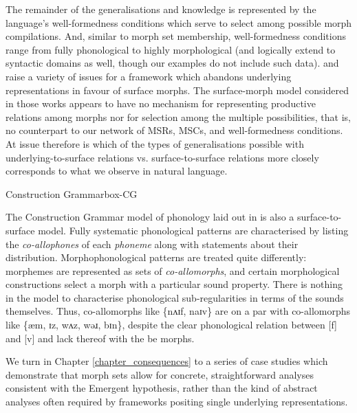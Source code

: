 The remainder of the generalisations and knowledge is represented by the language's well-formedness conditions which serve to select among possible morph compilations. And, similar to morph set membership, well-formedness conditions range from fully phonological to highly morphological (and logically extend to syntactic domains as well, though our examples do not include such data). \citet{Bermudez-Otero:2018} and \citet{Hyman:2018} raise a variety of issues for a framework which abandons underlying representations in favour of surface morphs. The surface-morph model considered in those works appears to have no mechanism for representing productive relations among morphs nor for selection among the multiple possibilities, that is, no counterpart to our network of MSRs, MSCs, and well-formedness conditions. At issue therefore is which of the types of generalisations possible with underlying-to-surface relations vs. surface-to-surface relations more closely corresponds to what we observe in natural language.

\begin{dadpbox}{Construction Grammar}{box-CG}

The Construction Grammar model of phonology laid out in \citet{Valimaa-Blum:2011} is also a surface-to-surface model. Fully systematic phonological patterns are characterised by listing the \textit{co-allophones} of each \textit{phoneme} along with statements about their distribution. Morphophonological patterns are treated quite differently: morphemes are represented as sets of \textit{co-allomorphs}, and certain morphological constructions select a morph with a particular sound property. There is nothing in the model to characterise phonological sub-regularities in terms of the sounds themselves. Thus, co-allomorphs like \{nʌɪf, naɪv\} are on a par with co-allomorphs like \{æm, ɪz, wʌz, wəɹ, bɪn\}, despite the clear phonological relation between [f] and [v] and lack thereof with the {\sc be} morphs.
\end{dadpbox}

We turn in Chapter \ref{chapter_consequences} to a series of case studies which demonstrate that morph sets allow for concrete, straightforward analyses consistent with the Emergent hypothesis, rather than the kind of abstract analyses often required by frameworks positing single underlying representations.
